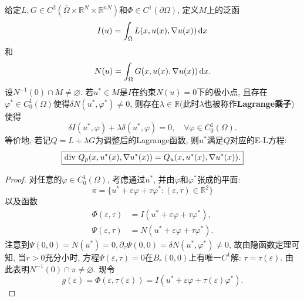 \begin{proposition}\label{prop1.60}
    给定$L, G \in C^2(\overline{\Omega} \times \mathbb{R}^N \times \mathbb{R}^{nN})$和$ \Phi \in C^1(\partial\Omega)$, 定义$M$上的泛函 
    \begin{equation*}
        I(u) = \int_{\Omega}L(x, u(x), \nabla u(x)) \,{\rm d}x 
    \end{equation*}
    和 
    \begin{equation*}
        N(u) = \int_{\Omega}G(x, u(x), \nabla u(x)) \,{\rm d}x. 
    \end{equation*}
    设$N^{-1}(0) \cap M \neq \varnothing$. 若$u^* \in M$是$I$在约束$N(u) = 0$下的极小点, 且存在$\varphi^* \in C_0^1(\Omega)$使得$\delta N(u^*, \varphi^*) \neq 0$, 则存在$\lambda \in \mathbb{R}$(此时$\lambda$也被称作\textbf{Lagrange乘子})使得
    \begin{equation*}
        \delta I(u^*, \varphi) + \lambda\delta(u^*, \varphi) = 0, \quad \forall \varphi \in C_0^1(\Omega).
    \end{equation*}
    等价地, 若记$Q = L + \lambda G$为调整后的Lagrange函数, 则$u^*$满足$Q$对应的E-L方程:
    \begin{equation*}
        \boxed{{\rm div}\ Q_p(x, u^*(x), \nabla u^*(x)) = Q_u(x, u^*(x), \nabla u^*(x)).}
    \end{equation*}
    \begin{proof}
        对任意的$\varphi \in C_0^1(\Omega)$, 考虑通过$u^*$, 并由$\varphi$和$\varphi^*$张成的平面:
        \begin{equation*}
            \pi = \{u^* + \varepsilon\varphi + \tau\varphi^*\colon (\varepsilon, \tau) \in \mathbb{R}^2\}
        \end{equation*}
        以及函数 
        \begin{align*}
            \Phi(\varepsilon, \tau) &= I(u^* + \varepsilon\varphi + \tau\varphi^*), \\   
            \Psi(\varepsilon, \tau) &= N(u^* + \varepsilon\varphi + \tau\varphi^*). 
        \end{align*}
        注意到$\Psi(0, 0) = N(u^*) = 0, \partial_{\tau}\Psi(0, 0) = \delta N(u^*, \varphi^*) \neq 0$, 故由隐函数定理可知, 当$r > 0$充分小时, 方程$\Psi(\varepsilon, \tau) = 0$在$B_r(0, 0)$上有唯一$C^1$解: $\tau = \tau(\varepsilon)$.
        由此表明$N^{-1}(0) \cap \pi \neq \varnothing$. 现令 
        \begin{equation*}
            g(\varepsilon) = \Phi(\varepsilon, \tau(\varepsilon)) = I(u^* + \varepsilon\varphi + \tau(\varepsilon)\varphi^*).
        \end{equation*}

\end{proof}
\end{proposition}
